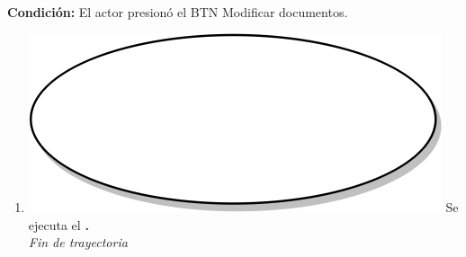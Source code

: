 \textbf{} \\
\textbf{Condición:} El actor presionó el BTN Modificar documentos. \\
 \begin{enumerate}[label=B\arabic*]
    \item {\includegraphics[scale=.05]{Capitulo3/img/proceso.png} Se ejecuta el \textbf{.}} \\
    \textit{Fin de trayectoria} \\
\end{enumerate}

